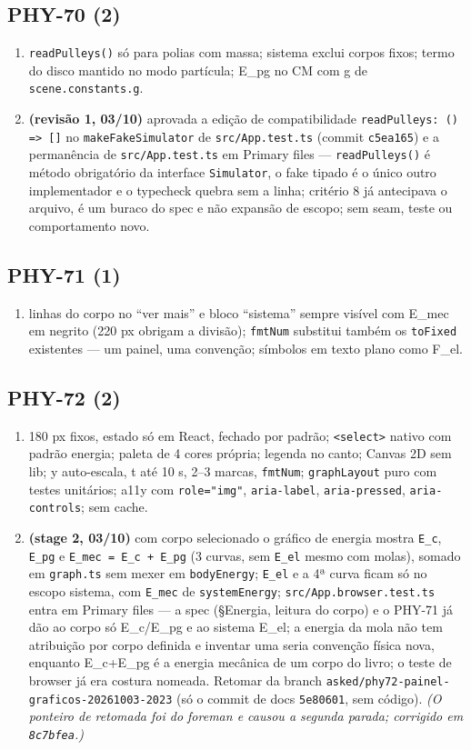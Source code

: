 \documentclass[11pt,a4paper]{article}
\begin{document}
{\subsection*{PHY-70 (2)}
\begin{enumerate}
  \item \texttt{readPulleys()} só para polias com massa; sistema exclui corpos fixos; termo do disco mantido no modo partícula; E\_pg no CM com g de \texttt{scene.constants.g}.
  \item \textbf{(revisão 1, 03/10)} aprovada a edição de compatibilidade \texttt{readPulleys: () => []} no \texttt{makeFakeSimulator} de \texttt{src/App.test.ts} (commit \texttt{c5ea165}) e a permanência de \texttt{src/App.test.ts} em Primary files --- \texttt{readPulleys()} é método obrigatório da interface \texttt{Simulator}, o fake tipado é o único outro implementador e o typecheck quebra sem a linha; critério 8 já antecipava o arquivo, é um buraco do spec e não expansão de escopo; sem seam, teste ou comportamento novo.
\end{enumerate}
\subsection*{PHY-71 (1)}
\begin{enumerate}
  \item linhas do corpo no ``ver mais'' e bloco ``sistema'' sempre visível com E\_mec em negrito (220 px obrigam a divisão); \texttt{fmtNum} substitui também os \texttt{toFixed} existentes --- um painel, uma convenção; símbolos em texto plano como F\_el.
\end{enumerate}
\subsection*{PHY-72 (2)}
\begin{enumerate}
  \item 180 px fixos, estado só em React, fechado por padrão; \texttt{<select>} nativo com padrão energia; paleta de 4 cores própria; legenda no canto; Canvas 2D sem lib; y auto-escala, t até 10 s, 2--3 marcas, \texttt{fmtNum}; \texttt{graphLayout} puro com testes unitários; a11y com \texttt{role="img"}, \texttt{aria-label}, \texttt{aria-pressed}, \texttt{aria-controls}; sem cache.
  \item \textbf{(stage 2, 03/10)} com corpo selecionado o gráfico de energia mostra \texttt{E\_c}, \texttt{E\_pg} e \texttt{E\_mec = E\_c + E\_pg} (3 curvas, sem \texttt{E\_el} mesmo com molas), somado em \texttt{graph.ts} sem mexer em \texttt{bodyEnergy}; \texttt{E\_el} e a 4ª curva ficam só no escopo sistema, com \texttt{E\_mec} de \texttt{systemEnergy}; \texttt{src/App.browser.test.ts} entra em Primary files --- a spec (§Energia, leitura do corpo) e o PHY-71 já dão ao corpo só E\_c/E\_pg e ao sistema E\_el; a energia da mola não tem atribuição por corpo definida e inventar uma seria convenção física nova, enquanto E\_c+E\_pg é a energia mecânica de um corpo do livro; o teste de browser já era costura nomeada. Retomar da branch \texttt{asked/phy72-painel-graficos-20261003-2023} (só o commit de docs \texttt{5e80601}, sem código). \emph{(O ponteiro de retomada foi do foreman e causou a segunda parada; corrigido em \texttt{8c7bfea}.)}
\end{enumerate}
}
\end{document}
